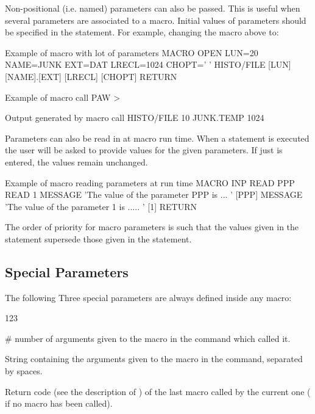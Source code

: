 Non-positional (i.e. named) parameters can also be passed.
This is useful when several parameters are associated to a macro.
Initial values of parameters should be specified in the  statement.
For example, changing the macro  above to:

\begin{XMPt}{Example of macro with lot of parameters}
MACRO OPEN LUN=20 NAME=JUNK EXT=DAT LRECL=1024 CHOPT=' '
  HISTO/FILE [LUN] [NAME].[EXT] [LRECL] [CHOPT]
RETURN
\end{XMPt}

\begin{XMPin}{Example of macro call}
PAW > 
\end{XMPin}
\begin{XMPout}{Output generated by macro call}
HISTO/FILE 10 JUNK.TEMP 1024
\end{XMPout}

Parameters can also be read in at macro run time. 
When a  statement is executed
the user will be asked to provide values for the given parameters.
If just  is entered, the values remain unchanged.
\begin{XMPt}{Example of macro reading parameters at run time}
MACRO INP
  READ PPP
  READ 1
  MESSAGE 'The value of the parameter PPP is ... ' [PPP]
  MESSAGE 'The value of the parameter 1 is ..... ' [1]
RETURN
\end{XMPt}
The order of priority for macro parameters is such that the values given
in the  statement supersede those given in the
 statement.

\subsection{Special Parameters}
 
The following Three special parameters are always defined inside 
any macro:
 
\begin{DLtt}{123}
\item[\lsb\#\rsb] 
number of arguments given to the macro in the 
command which called it.
\item[\lsb*\rsb] 
String containing the arguments given to the macro in the
 command, separated by spaces.
\item[\lsb@\rsb]
Return code (see the description of )
of the last macro called by the current one
( if no macro has been called).
\end{DLtt}
 
